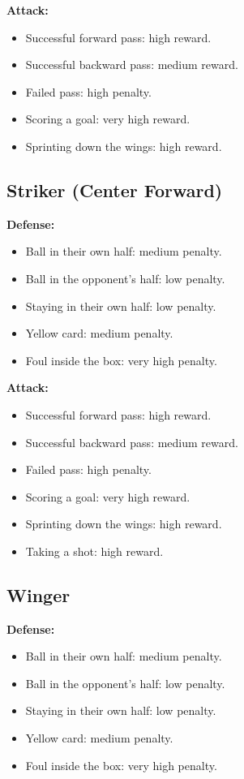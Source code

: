 \documentclass{article}
\begin{document}
\textbf{Attack:}
\begin{itemize}
    \item Successful forward pass: high reward.
    \item Successful backward pass: medium reward.
    \item Failed pass: high penalty.
    \item Scoring a goal: very high reward.
    \item Sprinting down the wings: high reward.
\end{itemize}

\subsection*{Striker (Center Forward)}
\textbf{Defense:}
\begin{itemize}
    \item Ball in their own half: medium penalty.
    \item Ball in the opponent's half: low penalty.
    \item Staying in their own half: low penalty.
    \item Yellow card: medium penalty.
    \item Foul inside the box: very high penalty.
\end{itemize}

\textbf{Attack:}
\begin{itemize}
    \item Successful forward pass: high reward.
    \item Successful backward pass: medium reward.
    \item Failed pass: high penalty.
    \item Scoring a goal: very high reward.
    \item Sprinting down the wings: high reward.
    \item Taking a shot: high reward.
\end{itemize}

\subsection*{Winger}
\textbf{Defense:}
\begin{itemize}
    \item Ball in their own half: medium penalty.
    \item Ball in the opponent's half: low penalty.
    \item Staying in their own half: low penalty.
    \item Yellow card: medium penalty.
    \item Foul inside the box: very high penalty.
\end{itemize}
\end{document}
